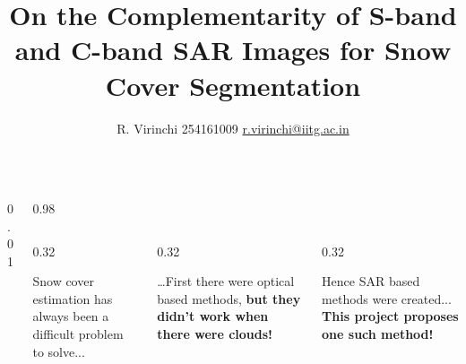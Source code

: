 \documentclass[final,svgnames,english]{beamer}
\title{On the Complementarity of S-band and C-band SAR Images for Snow Cover Segmentation}
\author{R. Virinchi 254161009 \url{r.virinchi@iitg.ac.in}}
\institute[]{Indian Institute of Technology Guwahati}
\begin{document}
\begin{frame}[fragile]{}
  \vspace{0em}
  \begin{columns}[T]
    \begin{column}{0.01\linewidth}
    \end{column}

    \begin{column}{0.98\linewidth}
      \begin{columns}[t]
        \begin{column}{0.32\linewidth}
          \begin{inriablock}{}
            \large Snow cover estimation has always been a difficult problem to solve...\raggedright
          \end{inriablock}
        \end{column}%
        \begin{column}{0.32\linewidth}
          \begin{inriablock}{}
            \large \ldots First there were optical based methods, \tcblower \large \textbf{but they didn't work when there were clouds!}
          \end{inriablock}
        \end{column}%
        \begin{column}{0.32\linewidth}
          \begin{inriablock}{}
            \large Hence SAR based methods were created... \textcolor{inria-rouge}{\textbf{This project proposes one such method!}}
          \end{inriablock}
        \end{column}
      \end{columns}


\end{column}
\end{columns}
\end{frame}
\end{document}
